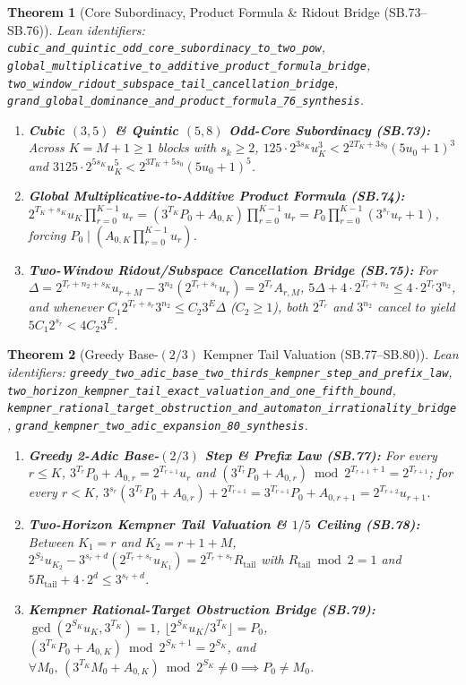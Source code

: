 \documentclass[11pt]{article}
\newtheorem{theorem}{Theorem}[section]
\begin{document}
\begin{theorem}[Core Subordinacy, Product Formula \& Ridout Bridge (SB.73--SB.76)]
\emph{Lean identifiers:} \nolinkurl{cubic_and_quintic_odd_core_subordinacy_to_two_pow}, \nolinkurl{global_multiplicative_to_additive_product_formula_bridge}, \nolinkurl{two_window_ridout_subspace_tail_cancellation_bridge}, \nolinkurl{grand_global_dominance_and_product_formula_76_synthesis}.
\begin{enumerate}
  \item \textbf{Cubic $(3,5)$ \& Quintic $(5,8)$ Odd-Core Subordinacy (SB.73):} Across $K = M + 1 \ge 1$ blocks with $s_k \ge 2$, $125 \cdot 2^{3 s_K} u_K^3 < 2^{2 T_K + 3 s_0}(5 u_0 + 1)^3$ and $3125 \cdot 2^{5 s_K} u_K^5 < 2^{3 T_K + 5 s_0}(5 u_0 + 1)^5$.
  \item \textbf{Global Multiplicative-to-Additive Product Formula (SB.74):} $2^{T_K+s_K} u_K \prod_{r=0}^{K-1} u_r = (3^{T_K} P_0 + A_{0,K}) \prod_{r=0}^{K-1} u_r = P_0 \prod_{r=0}^{K-1} (3^{s_r} u_r + 1)$, forcing $P_0 \mid (A_{0,K} \prod_{r=0}^{K-1} u_r)$.
  \item \textbf{Two-Window Ridout/Subspace Cancellation Bridge (SB.75):} For $\Delta = 2^{T_r+n_2+s_K} u_{r+M} - 3^{n_2}(2^{T_r+s_r} u_r) = 2^{T_r} A_{r,M}$, $5 \Delta + 4 \cdot 2^{T_r+n_2} \le 4 \cdot 2^{T_r} 3^{n_2}$, and whenever $C_1 2^{T_r+s_r} 3^{n_2} \le C_2 3^E \Delta$ ($C_2 \ge 1$), both $2^{T_r}$ and $3^{n_2}$ cancel to yield $5 C_1 2^{s_r} < 4 C_2 3^E$.
\end{enumerate}
\end{theorem}

\begin{theorem}[Greedy Base-$(2/3)$ Kempner Tail Valuation (SB.77--SB.80)]
\emph{Lean identifiers:} \nolinkurl{greedy_two_adic_base_two_thirds_kempner_step_and_prefix_law}, \nolinkurl{two_horizon_kempner_tail_exact_valuation_and_one_fifth_bound}, \nolinkurl{kempner_rational_target_obstruction_and_automaton_irrationality_bridge}, \nolinkurl{grand_kempner_two_adic_expansion_80_synthesis}.
\begin{enumerate}
  \item \textbf{Greedy 2-Adic Base-$(2/3)$ Step \& Prefix Law (SB.77):} For every $r \le K$, $3^{T_r} P_0 + A_{0,r} = 2^{T_{r+1}} u_r$ and $(3^{T_r} P_0 + A_{0,r}) \bmod 2^{T_{r+1}+1} = 2^{T_{r+1}}$; for every $r < K$, $3^{s_r}(3^{T_r} P_0 + A_{0,r}) + 2^{T_{r+1}} = 3^{T_{r+1}} P_0 + A_{0,r+1} = 2^{T_{r+2}} u_{r+1}$.
  \item \textbf{Two-Horizon Kempner Tail Valuation \& $1/5$ Ceiling (SB.78):} Between $K_1 = r$ and $K_2 = r + 1 + M$, $2^{S_2} u_{K_2} - 3^{s_r+d}(2^{T_r+s_r} u_{K_1}) = 2^{T_r+s_r} R_{\text{tail}}$ with $R_{\text{tail}} \bmod 2 = 1$ and $5 R_{\text{tail}} + 4 \cdot 2^d \le 3^{s_r+d}$.
  \item \textbf{Kempner Rational-Target Obstruction Bridge (SB.79):} $\gcd(2^{S_K} u_K, 3^{T_K}) = 1$, $\lfloor 2^{S_K} u_K / 3^{T_K} \rfloor = P_0$, $(3^{T_K} P_0 + A_{0,K}) \bmod 2^{S_K+1} = 2^{S_K}$, and $\forall M_0,\, (3^{T_K} M_0 + A_{0,K}) \bmod 2^{S_K} \ne 0 \implies P_0 \ne M_0$.
\end{enumerate}
\end{theorem}
\end{document}
